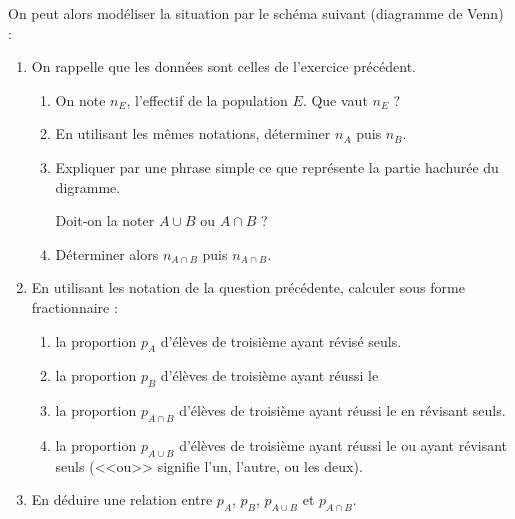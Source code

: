 \documentclass[10pt,openright,twoside,french]{book}
\begin{document}
On peut alors modéliser la situation par le schéma suivant (diagramme de Venn) :

\begin{center}
\end{center}

\begin{enumerate}
    \item On rappelle que les données sont celles de l'exercice précédent.
        \begin{enumerate}
            \item On note $n_E$, l'effectif de la population $E$. Que vaut $n_E$ ?
            \item En utilisant les mêmes notations, déterminer $n_A$ puis $n_B$.
            \item Expliquer par une phrase simple ce que représente la partie hachurée du digramme.\par Doit-on la noter $A \cup B$ ou $A \cap B$ ?
            \item Déterminer alors $n_{A \cap B}$ puis $n_{A \cap B}$.
        \end{enumerate}
    \item En utilisant les notation de la question précédente, calculer sous forme fractionnaire :
        \begin{enumerate}
            \item la proportion $p_A$ d'élèves de troisième ayant révisé seuls.
            \item la proportion $p_B$ d'élèves de troisième ayant réussi le 
            \item la proportion $p_{A\cap B}$ d'élèves de troisième ayant réussi le  en révisant seuls.
            \item la proportion $p_{A\cup B}$ d'élèves de troisième ayant réussi le  ou ayant révisant seuls (<<ou>> signifie l'un, l'autre, ou les deux).
        \end{enumerate}
    \item En déduire une relation entre $p_A$, $p_B$, $p_{A \cup B}$ et $p_{A \cap B}$.
\end{enumerate}
\end{document}
